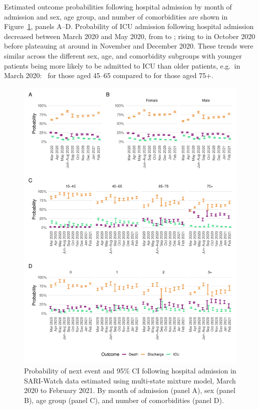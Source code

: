 Estimated outcome probabilities following hospital admission by month of admission and sex, age group, and number of comorbidities are shown in Figure~\ref{fig:sari-event-prob}, panels A--D. Probability of ICU admission following hospital admission decreased between March 2020 and May 2020, from  to ; rising to  in October 2020 before plateauing at around  in November and December 2020. These trends were similar across the different sex, age, and comorbidity subgroups with younger patients being more likely to be admitted to ICU than older patients, e.g.\ in March 2020:\  for those aged 45--65 compared to  for those aged 75+.

\begin{figure}[htbp!]
    \centering
    \includegraphics[width=\textwidth]{sari_event_prob.pdf}
    \caption[Probability of next event following hospital admission in SARI-Watch data estimated using multi-state mixture model, March 2020 to February 2021]{Probability of next event and 95\% CI following hospital admission in SARI-Watch data estimated using multi-state mixture model, March 2020 to February 2021. By month of admission (panel A), sex (panel B), age group (panel C), and number of comorbidities (panel D).}\label{fig:sari-event-prob}
\end{figure}

